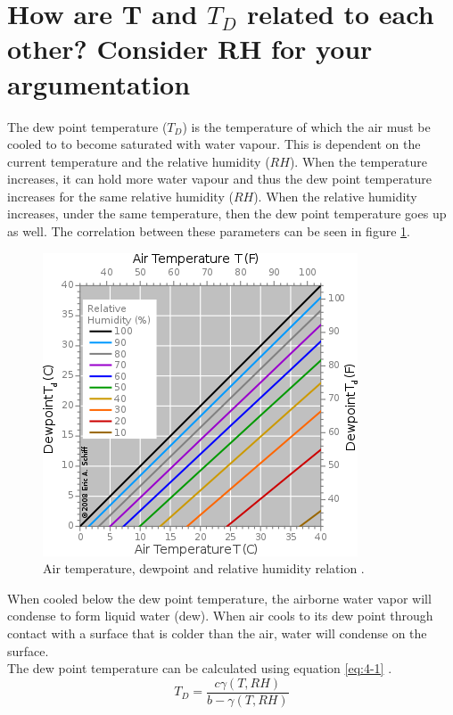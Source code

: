 \documentclass{article}
\begin{document}
\newpage
\section{How are T and $T_D$ related to each other? Consider RH for your argumentation}
The dew point temperature ($T_D$) is the temperature of which the air must be cooled to to become saturated with water vapour. This is dependent on the current temperature and the relative humidity ($RH$). When the temperature increases, it can hold more water vapour and thus the dew point temperature increases for the same relative humidity ($RH$). When the relative humidity increases, under the same temperature, then the dew point temperature goes up as well. The correlation between these parameters can be seen in figure \ref{fig:Q4}.\\

\begin{figure}[H]
	\centering
	\includegraphics[width=.5\textwidth]{figures/Dewpoint-RH.png}
	\caption{Air temperature, dewpoint and relative humidity relation \cite{wikiQ4}.}
	\label{fig:Q4}
\end{figure}

When cooled below the dew point temperature, the airborne water vapor will condense to form liquid water (dew). When air cools to its dew point through contact with a surface that is colder than the air, water will condense on the surface.\\

The dew point temperature can be calculated using equation \ref{eq:4-1} \cite{wikiQ4}.
\begin{equation}
T_D = \frac{c \gamma (T, RH)}{b - \gamma (T, RH)} \label{eq:4-1}
\end{equation}
\end{document}

